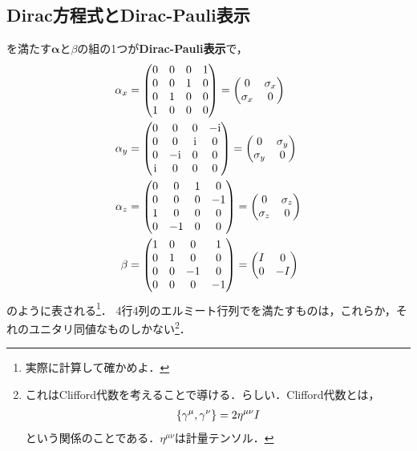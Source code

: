 \documentclass{report}
\begin{document}
  \subsection{Dirac方程式とDirac-Pauli表示}
    を満たす$\bm{\alpha}$と$\beta$の組の1つが\textbf{Dirac-Pauli表示}で，
    \begin{align}
      \alpha_x &= 
      \mqty(
        0 & 0 & 0 & 1\\
        0 & 0 & 1 & 0\\
        0 & 1 & 0 & 0\\
        1 & 0 & 0 & 0\\
      )
      =
      \mqty(
        0 & \sigma_x\\
        \sigma_x & 0
      )\\
      \alpha_y &= 
      \mqty(
        0 & 0 & 0 & -\i\\
        0 & 0 & \i & 0\\
        0 & -\i & 0 & 0\\
        \i & 0 & 0 & 0\\
      )
      =
      \mqty(
        0 & \sigma_y\\
        \sigma_y & 0
      )\\
      \alpha_z &= 
      \mqty(
        0 & 0 & 1 & 0\\
        0 & 0 & 0 & -1\\
        1 & 0 & 0 & 0\\
        0 & -1 & 0 & 0\\
      )
      =
      \mqty(
        0 & \sigma_z\\
        \sigma_z & 0
      )\\
      \beta &= 
      \mqty(
        1 & 0 & 0 & 1\\
        0 & 1 & 0 & 0\\
        0 & 0 & -1 & 0\\
        0 & 0 & 0 & -1\\
      )
      =
      \mqty(
        I & 0\\
        0 & -I
      )
    \end{align}
    のように表される\footnote{実際に計算して確かめよ．}．
    4行4列のエルミート行列でを満たすものは，これらか，それのユニタリ同値なものしかない\footnote{
      これはClifford代数を考えることで導ける．らしい．Clifford代数とは，
      \begin{align}
        \qty{ \gamma^\mu, \gamma^\nu } = 2\eta^{\mu\nu} I
      \end{align}
      という関係のことである．$\eta^{\mu\nu}$は計量テンソル．
    }．
\end{document}
